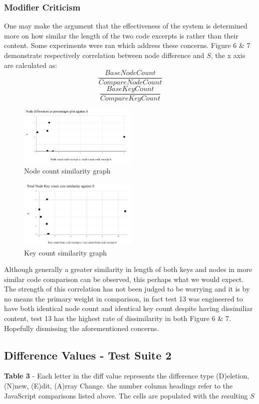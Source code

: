 \documentclass[jou,apacite]{apa6}
\begin{document}
\subsubsection{Modifier Criticism}
One may make the argument that the effectiveness of the system is determined more on how similar the length of the two code excerpts is rather than their content. Some experiments were ran which address these concerns. Figure 6 \& 7 demonstrate respectively correlation between node difference and $S$, the x axis are calculated as: \[\dfrac{Base Node Count }{Compare Node Count}\] \[\dfrac{Base Key Count }{Compare Key Count}\]

				\begin{figure}[h]
\caption{Node count similarity graph}
\centering
\includegraphics[width=0.50\textwidth]{nodecount}
\end{figure}

				\begin{figure}[h]
\caption{Key count similarity graph}
\centering
\includegraphics[width=0.50\textwidth]{keycount}
\end{figure}

Although generally a greater similarity in length of both keys and nodes in more similar code comparison can be observed, this perhaps what we would expect. The strength of this correlation has not been judged to be worrying and it is by no means the primary weight in comparison, in fact test 13 was engineered to have both identical node count and identical key count despite having dissimiliar content, test 13 has the highest rate of dissimilarity in both Figure 6 \& 7. Hopefully dismissing the aforementioned concerns.

\subsection{Difference Values - Test Suite 2}
\textbf{Table 3} - Each letter in the diff value represents the difference type (D)eletion, (N)new, (E)dit, (A)rray Change. the number column headings refer to the JavaScript comparisons listed above. The cells are populated with the resulting $S$
\end{document}

